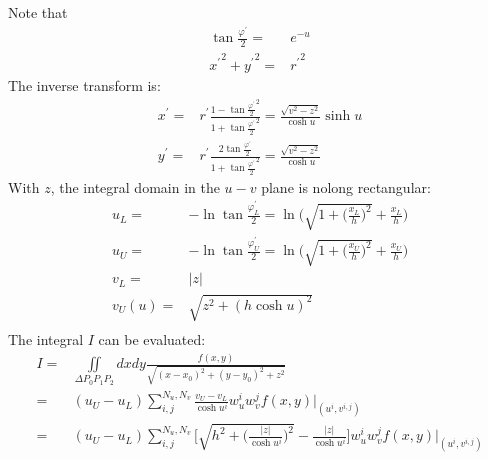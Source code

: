 \documentclass [10pt,letterpaper]{article}
\begin{document}
Note that
\begin{equation} \label{eq:radial-angular-method-tanvarphiover2-eu-xp2-yp2-rp2}
	\begin{split} 
		\tan{\frac{\varphi^{\prime}}{2}}	=&	e^{-u}
		\\
		{x^{\prime}}^2 + {y^{\prime}}^2		=&	{r^{\prime}}^2
	\end{split}
\end{equation}
The inverse transform is:
\begin{subequations} \label{eq:radial-angular-method-xp-yp-u-v}
	\begin{align}
		x^{\prime} 
		=& 
			r^{\prime}
			\frac
			{ 1-{\tan{\frac{\varphi^{\prime}}{2}}}^2 }
			{ 1+{\tan{\frac{\varphi^{\prime}}{2}}}^2 }
		=
			\frac{ \sqrt{v^2-z^2} } { \cosh{u} }
			\sinh{u}
		\\
		y^{\prime}
		=& 
			r^{\prime}
			\frac
			{ 2 \tan{\frac{\varphi^{\prime}}{2}} }
			{ 1+{\tan{\frac{\varphi^{\prime}}{2}}}^2 }
		= 
			\frac{ \sqrt{v^2-z^2} } { \cosh{u} }
	\end{align}
\end{subequations}
With $z$, the integral domain in the $u-v$ plane is nolong rectangular:
\begin{equation} \label{eq:radial-angular-method-uL-uU-vL-uU}
	\begin{split} 
		u_L	=&
			-\ln{\tan{\frac{\varphi^{\prime}_L}{2}}}
			= 
			\ln\bigg(
				\sqrt{1+\bigg(\frac{x_L}{h}\bigg)^2}
				+ \frac{x_L}{h}
			\bigg)
		\\
		u_U	=&
			-\ln{\tan{\frac{\varphi^{\prime}_U}{2}}}
			= 
			\ln\bigg(
				\sqrt{1+\bigg(\frac{x_U}{h}\bigg)^2}
				+ \frac{x_U}{h}
			\bigg)
		\\
		v_L	=&	\lvert z \rvert				\\
		v_U(u)	=&	\sqrt{ z^2 + (h \cosh{u})^2 }		\\ 
	\end{split}
\end{equation}
The integral $I$ can be evaluated:
\begin{equation} \label{eq:radial-angular-method-quadrature-rule-result}
	\begin{split} 
		I
		=&
		\iint \limits_{\Delta P_0 P_1 P_2}
		dx dy
		\frac{ f(x,y) } { \sqrt{ (x-x_0)^2 + (y-y_0)^2 + z^2 } }
		\\
		=&
		(u_U-u_L)
		\sum \nolimits_{i,j}^{N_u,N_v} 
		\frac{ v_U-v_L }{ \cosh{u^i} }
		w_u^i w_v^j
		f(x,y)
		\big\vert
		_{ (u^i,v^{i,j}) }
		\\
		=&
		(u_U-u_L)
		\sum \nolimits_{i,j}^{N_u,N_v} 
		\bigg [
			\sqrt{ h^2 + \bigg(
				\frac{ \lvert z \rvert } { \cosh{u^i} } \bigg)^2 }
			- \frac{ \lvert z \rvert } { \cosh{u^i} }
		\bigg ]
		w_u^i w_v^j
		f(x,y)
		\big\vert
		_{ (u^i,v^{i,j}) }
	\end{split}
\end{equation}
\end{document}
